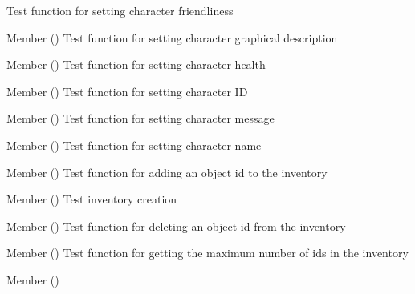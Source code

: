 \begin{DoxyRefList}
%
Test function for setting character friendliness  
\item[Member \doxylink{character__test_8h_aa1b7139bcfb29316a803cfd360b3bbcd}{test2\+\_\+character\+\_\+set\+\_\+gdesc} ()]\label{test__test000021}%
%
Test function for setting character graphical description  
\item[Member \doxylink{character__test_8h_ac5e97fabc0591e9b2021d0ced0b39300}{test2\+\_\+character\+\_\+set\+\_\+health} ()]\label{test__test000024}%
%
Test function for setting character health  
\item[Member \doxylink{character__test_8h_acee8dbf1f524f775b598e4a58136cc53}{test2\+\_\+character\+\_\+set\+\_\+id} ()]\label{test__test000016}%
%
Test function for setting character ID  
\item[Member \doxylink{character__test_8h_afae2256c79ebaf31b7402307dad69253}{test2\+\_\+character\+\_\+set\+\_\+message} ()]\label{test__test000029}%
%
Test function for setting character message  
\item[Member \doxylink{character__test_8h_a74b160bc91661973b864acec8b9a16ce}{test2\+\_\+character\+\_\+set\+\_\+name} ()]\label{test__test000018}%
%
Test function for setting character name  
\item[Member \doxylink{inventory__test_8h_a5277b6da31c171a065fa0ed0614b4e96}{test2\+\_\+inventory\+\_\+add\+\_\+obj\+\_\+id} ()]\label{test__test000034}%
%
Test function for adding an object id to the inventory  
\item[Member \doxylink{inventory__test_8h_a73a6080c360a8870c4ffc734e989c8b3}{test2\+\_\+inventory\+\_\+create} ()]\label{test__test000032}%
%
Test inventory creation  
\item[Member \doxylink{inventory__test_8h_a52d8703935f4944a5f78dc6552ca428f}{test2\+\_\+inventory\+\_\+delete\+\_\+obj\+\_\+id} ()]\label{test__test000036}%
%
Test function for deleting an object id from the inventory  
\item[Member \doxylink{inventory__test_8h_ab8a07623d86b3f0d414e4b648fcea9ca}{test2\+\_\+inventory\+\_\+get\+\_\+max\+\_\+objs} ()]\label{test__test000040}%
%
Test function for getting the maximum number of ids in the inventory  
\item[Member \doxylink{inventory__test_8h_a7da9c9d7f8a039bb129d238b4fd9cab9}{test2\+\_\+inventory\+\_\+get\+\_\+n\+\_\+objs} ()]\label{test__test000042}%

\end{DoxyRefList}
